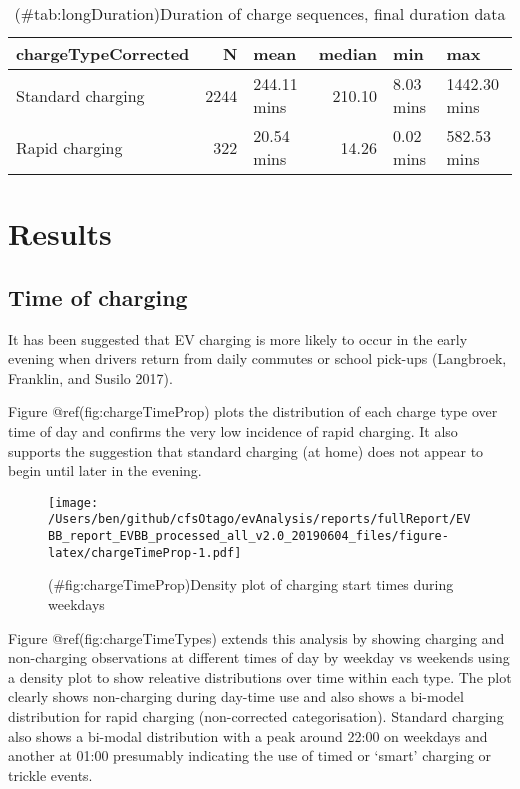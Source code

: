\documentclass[]{article}
\begin{document}
\begin{table}[t]

\caption{(\#tab:longDuration)Duration of charge sequences, final duration data}
\centering
\begin{tabular}{l|r|l|r|l|l}
\hline
chargeTypeCorrected & N & mean & median & min & max\\
\hline
Standard charging & 2244 & 244.11 mins & 210.10 & 8.03 mins & 1442.30 mins\\
\hline
Rapid charging & 322 & 20.54 mins & 14.26 & 0.02 mins & 582.53 mins\\
\hline
\end{tabular}
\end{table}

\hypertarget{results}{%
\section{Results}\label{results}}

\hypertarget{time-of-charging}{%
\subsection{Time of charging}\label{time-of-charging}}

It has been suggested that EV charging is more likely to occur in the early evening when drivers return from daily commutes or school pick-ups (Langbroek, Franklin, and Susilo 2017).

Figure @ref(fig:chargeTimeProp) plots the distribution of each charge type over time of day and confirms the very low incidence of rapid charging. It also supports the suggestion that standard charging (at home) does not appear to begin until later in the evening.

\begin{figure}
\centering
\texttt{[image: /Users/ben/github/cfsOtago/evAnalysis/reports/fullReport/EVBB\_report\_EVBB\_processed\_all\_v2.0\_20190604\_files/figure-latex/chargeTimeProp-1.pdf]}
\caption{(\#fig:chargeTimeProp)Density plot of charging start times during weekdays}
\end{figure}

Figure @ref(fig:chargeTimeTypes) extends this analysis by showing charging and non-charging observations at different times of day by weekday vs weekends using a density plot to show releative distributions over time within each type. The plot clearly shows non-charging during day-time use and also shows a bi-model distribution for rapid charging (non-corrected categorisation). Standard charging also shows a bi-modal distribution with a peak around 22:00 on weekdays and another at 01:00 presumably indicating the use of timed or `smart' charging or trickle events.
\end{document}

